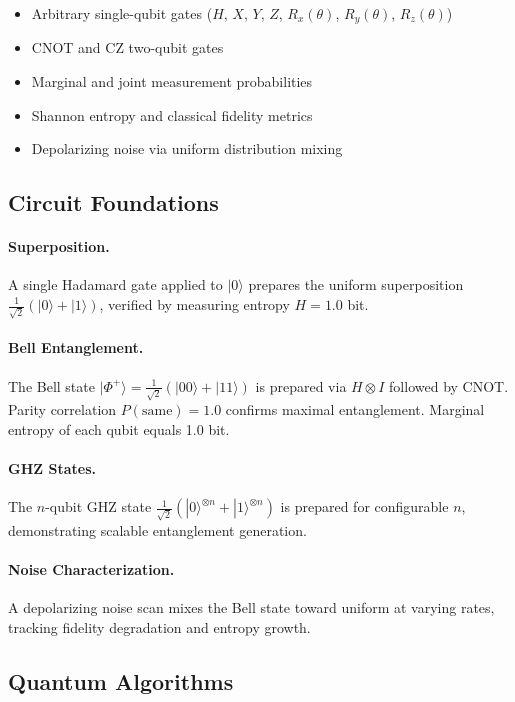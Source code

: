 \documentclass[conference]{IEEEtran}
\begin{document}
\begin{itemize}
  \item Arbitrary single-qubit gates ($H$, $X$, $Y$, $Z$, $R_x(\theta)$, $R_y(\theta)$, $R_z(\theta)$)
  \item CNOT and CZ two-qubit gates
  \item Marginal and joint measurement probabilities
  \item Shannon entropy and classical fidelity metrics
  \item Depolarizing noise via uniform distribution mixing
\end{itemize}

\subsection{Circuit Foundations}

\paragraph{Superposition.} A single Hadamard gate applied to $|0\rangle$ prepares the uniform superposition $\frac{1}{\sqrt{2}}(|0\rangle + |1\rangle)$, verified by measuring entropy $H = 1.0$ bit.

\paragraph{Bell Entanglement.} The Bell state $|\Phi^+\rangle = \frac{1}{\sqrt{2}}(|00\rangle + |11\rangle)$ is prepared via $H \otimes I$ followed by CNOT. Parity correlation $P(\text{same}) = 1.0$ confirms maximal entanglement. Marginal entropy of each qubit equals 1.0 bit.

\paragraph{GHZ States.} The $n$-qubit GHZ state $\frac{1}{\sqrt{2}}(|0\rangle^{\otimes n} + |1\rangle^{\otimes n})$ is prepared for configurable $n$, demonstrating scalable entanglement generation.

\paragraph{Noise Characterization.} A depolarizing noise scan mixes the Bell state toward uniform at varying rates, tracking fidelity degradation and entropy growth.

\subsection{Quantum Algorithms}
\end{document}
